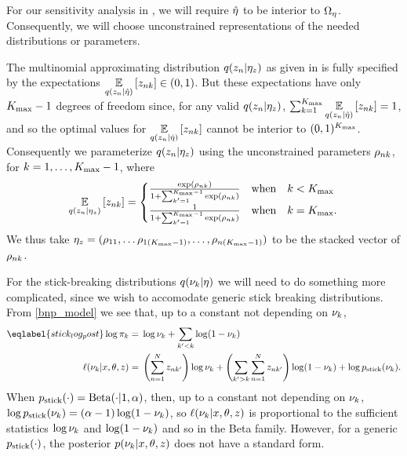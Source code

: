 
For our sensitivity analysis in , we will require
$\hat\eta$ to be interior to $\Omega_{\eta}$.  Consequently, we will choose
unconstrained representations of the needed distributions or parameters.


\begin{ex}
%
The multinomial approximating distribution $q(z_n \vert \eta_{z})$ as given in
 is fully specified by the expectations $\underset{q(z_n \vert
\hat\eta)}{\mathbb{E}}\left[z_{nk}\right] \in (0, 1)$.  But these expectations have only ${K_{\mathrm{max}}} -1$
degrees of freedom since, for any valid $q(z_n \vert \eta_{z})$,
$\sum_{k=1}^{K_{\mathrm{max}}} \underset{q(z_n \vert \hat\eta)}{\mathbb{E}}\left[z_{nk}\right] = 1$, and so the
optimal values for $\underset{q(z_n \vert \hat\eta)}{\mathbb{E}}\left[z_{nk}\right]$ cannot be
interior to $(0,1)^{K_{\mathrm{max}}}$.  Consequently we parameterize
$q(z_n \vert \eta_{z})$ using the unconstrained parameters $\rho_{nk}$,
for $k=1,\ldots,{K_{\mathrm{max}}} - 1$, where
%
\begin{align*}
%
\expect{\q(\z_\n \vert \etaz)}{\z_{\n\k}} =
\begin{cases}
    \frac{\exp(\rho_{\n\k})}{1 + \sum_{\k'=1}^{\kmax - 1}\exp(\rho_{\n\k})}
    & \mathrm{ when }\quad\k < \kmax \\
    \frac{1}{1 + \sum_{\k'=1}^{\kmax - 1}\exp(\rho_{\n\k})}
    & \mathrm{ when }\quad\k = \kmax.
\end{cases}
%
\end{align*}
%
We thus take $\eta_{z} = (\rho_{11}, \ldots \rho_{1({K_{\mathrm{max}}} - 1)}, \ldots,
\rho_{n({K_{\mathrm{max}}} - 1)})$ to be the stacked vector of $\rho_{nk}$.
%
\end{ex}



For the stick-breaking distributions $q(\nu_{k} \vert \eta)$ we will need to do
something more complicated, since we wish to accomodate generic stick breaking
distributions.  From \eqref{bnp_model} we see that, up to a constant not
depending on $\nu_{k}$,
%
\begin{align}\eqlabel{stick_log_post}
%
\log \pi_\k ={}&
    \log \nuk + \sum_{\k' < \k} \log (1 - \nuk) \nonumber \\
\logp(\nu_{\k} \vert \x, \theta, \z) ={}&
    \left(\sum_{\n=1}^\N \z_{\n\k'}\right) \log \nuk +
    \left( \sum_{\k' > \k} \sum_{\n=1}^\N \z_{\n\k'} \right) \log (1 - \nuk) +
    \log \pstick(\nuk).
%
\end{align}
%
When $p_{\mathrm{stick}}(\cdot) = \mathrm{Beta}(\cdot | 1, \alpha)$, then, up to a constant
not depending on $\nu_{k}$, $\log p_{\mathrm{stick}}(\nu_{k}) = (\alpha - 1) \log (1 -
\nu_{k})$, so $\ell(\nu_{k} \vert x, \theta, z)$ is proportional to the
sufficient statistics $\log \nu_{k}$ and $\log(1 - \nu_{k})$ and so in the
Beta family.  However, for a generic $p_{\mathrm{stick}}(\cdot)$, the posterior
$p(\nu_{k} \vert x, \theta, z)$ does not have a standard form.

